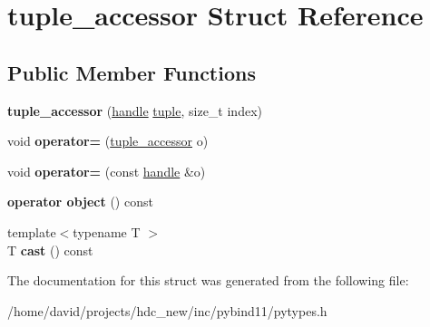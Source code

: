 \hypertarget{structtuple__accessor}{}\section{tuple\+\_\+accessor Struct Reference}
\label{structtuple__accessor}
\subsection*{Public Member Functions}
\begin{DoxyCompactItemize}
\item 
{\bfseries tuple\+\_\+accessor} (\hyperlink{classhandle}{handle} \hyperlink{classtuple}{tuple}, size\+\_\+t index)\hypertarget{structtuple__accessor_a03c3d97fb13f97fe32176a7324369c28}{}\label{structtuple__accessor_a03c3d97fb13f97fe32176a7324369c28}

\item 
void {\bfseries operator=} (\hyperlink{structtuple__accessor}{tuple\+\_\+accessor} o)\hypertarget{structtuple__accessor_afe986a9d7bc41035b7fc1ff97e8f7b86}{}\label{structtuple__accessor_afe986a9d7bc41035b7fc1ff97e8f7b86}

\item 
void {\bfseries operator=} (const \hyperlink{classhandle}{handle} \&o)\hypertarget{structtuple__accessor_aac1692bb5d337f510499896b3369ef01}{}\label{structtuple__accessor_aac1692bb5d337f510499896b3369ef01}

\item 
{\bfseries operator object} () const \hypertarget{structtuple__accessor_a785a7df34971aac38d347d881c756881}{}\label{structtuple__accessor_a785a7df34971aac38d347d881c756881}

\item 
{\footnotesize template$<$typename T $>$ }\\T {\bfseries cast} () const \hypertarget{structtuple__accessor_a30eec5476e9d81c6fe30f9e98231de78}{}\label{structtuple__accessor_a30eec5476e9d81c6fe30f9e98231de78}

\end{DoxyCompactItemize}


The documentation for this struct was generated from the following file\+:\begin{DoxyCompactItemize}
\item 
/home/david/projects/hdc\+\_\+new/inc/pybind11/pytypes.\+h\end{DoxyCompactItemize}
